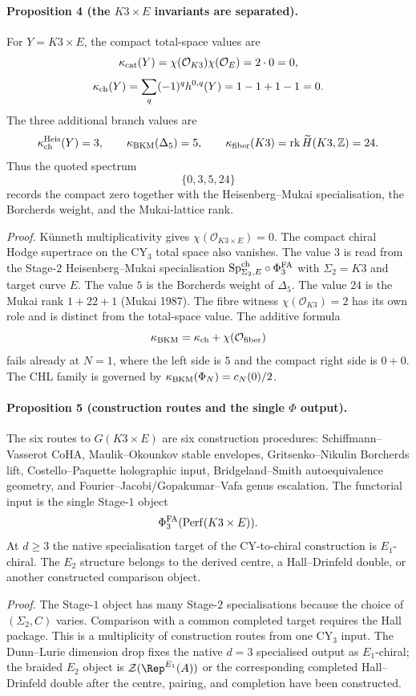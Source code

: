 \paragraph{Proposition 4 (the $K3\times E$ invariants are separated).}
For $Y=K3\times E$, the compact total-space values are
\[
\kappa_{\mathrm{cat}}(Y)=\chi(\mathcal O_{K3})\chi(\mathcal O_E)=2\cdot0=0,
\]
\[
\kappa_{\mathrm{ch}}(Y)=\sum_q(-1)^q h^{0,q}(Y)=1-1+1-1=0.
\]
The three additional branch values are
\[
\kappa_{\mathrm{ch}}^{\mathrm{Heis}}(Y)=3,\qquad
\kappa_{\mathrm{BKM}}(\Delta_5)=5,\qquad
\kappa_{\mathrm{fiber}}(K3)=\mathrm{rk}\,\widetilde H(K3,\mathbb{Z})=24.
\]
Thus the quoted spectrum
\[
\{0,3,5,24\}
\]
records the compact zero together with the Heisenberg--Mukai
specialisation, the Borcherds weight, and the Mukai-lattice rank.

\emph{Proof.}
K\"unneth multiplicativity gives $\chi(\mathcal O_{K3\times E})=0$.
The compact chiral Hodge supertrace on the CY$_3$ total space also
vanishes. The value $3$ is read from the Stage-$2$
Heisenberg--Mukai specialisation
$\mathrm{Sp}^{\mathrm{ch}}_{\Sigma_2,E}\circ\Phi^{\mathrm{FA}}_3$ with $\Sigma_2=K3$ and target curve
$E$. The value $5$ is the Borcherds weight of $\Delta_5$. The value
$24$ is the Mukai rank $1+22+1$ (Mukai 1987). The fibre witness
$\chi(\mathcal O_{K3})=2$ has its own role and is distinct from the
total-space value. The additive formula
\[
\kappa_{\mathrm{BKM}}=\kappa_{\mathrm{ch}}+\chi(\mathcal O_{\mathrm{fiber}})
\]
fails already at $N=1$, where the left side is $5$ and the compact
right side is $0+0$. The CHL family is governed by
$\kappa_{\mathrm{BKM}}(\Phi_N)=c_N(0)/2$.

\paragraph{Proposition 5 (construction routes and the single \(\Phi\)
output).}
The six routes to $G(K3\times E)$ are six construction procedures:
Schiffmann--Vasserot CoHA, Maulik--Okounkov stable envelopes,
Gritsenko--Nikulin Borcherds lift, Costello--Paquette holographic
input, Bridgeland--Smith autoequivalence geometry, and
Fourier--Jacobi/Gopakumar--Vafa genus escalation. The functorial input
is the single Stage-$1$ object
\[
\Phi^{\mathrm{FA}}_3(\mathrm{Perf}(K3\times E)).
\]
At $d\geq3$ the native specialisation target of the CY-to-chiral
construction is $E_1$-chiral. The $E_2$ structure belongs to the
derived centre, a Hall--Drinfeld double, or another constructed
comparison object.

\emph{Proof.}
The Stage-$1$ object has many Stage-$2$ specialisations because the
choice of $(\Sigma_2,C)$ varies. Comparison with a common completed
target requires the Hall package. This is a multiplicity of construction
routes from one CY$_3$ input. The Dunn--Lurie dimension drop fixes the
native $d=3$ specialised output as $E_1$-chiral; the braided $E_2$
object is
$\mathcal Z(\Rep^{E_1}(A))$ or the corresponding completed
Hall--Drinfeld double after the centre, pairing, and completion have
been constructed.

